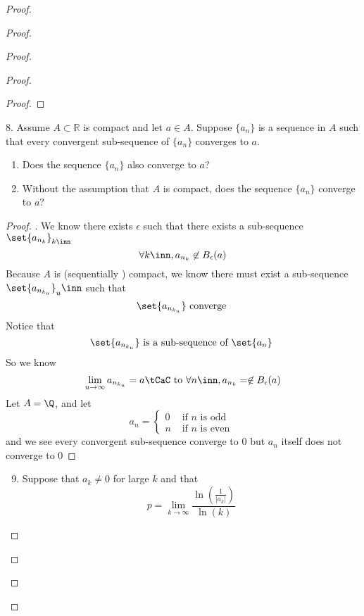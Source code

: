 \documentclass{report}
\begin{document}
\begin{proof}
\begin{proof}
\begin{proof}
\begin{proof}
\begin{proof}
\end{proof}
\begin{question}{}{}
8. Assume \( A \subset \mathbb{R} \) is compact and let \( a \in A \). Suppose \( \{ a_n \} \) is a sequence in \( A \) such that every convergent sub-sequence of \( \{ a_n \} \) converges to \( a \). 
    \begin{enumerate}
        \item Does the sequence \( \{ a_n \} \) also converge to \( a \)?
        \item Without the assumption that \( A \) is compact, does the sequence \( \{ a_n \} \) converge to \( a \)?
    \end{enumerate}
\end{question}
\begin{proof}
. We know there exists $\epsilon $ such that there exists a sub-sequence $\set{a_{n_k}}_{k\inn}$
\begin{equation*}
\forall k\inn, a_{n_k}\not\in B_{\epsilon }(a)
\end{equation*}
Because  $A$ is (sequentially ) compact,  we know there must exist a sub-sequence $\set{a_{n_{k_u}}}_u\inn$ such that
\begin{equation*}
\set{a_{n_{k_u}}}\text{ converge }
\end{equation*}
Notice that
\begin{equation*}
\set{a_{n_{k_u}}}\text{ is a sub-sequence of $\set{a_n}$ }
\end{equation*}
So we know 
 \begin{equation*}
\lim_{u\to\infty}a_{n_{k_u}}=a\tCaC\text{ to }\forall n\inn, a_{n_{k}}=\not\in B_\epsilon (a)
\end{equation*}
Let $A=\Q$, and let
 \begin{equation*}
a_n=\begin{cases}
  0& \text{ if $n$ is odd }\\
  n& \text{ if $n$ is even }
\end{cases}
\end{equation*}
and we see every convergent sub-sequence converge to $0$ but  $a_n$ itself does not converge to  $0$
\end{proof}
\begin{question}{}{}
\begin{enumerate}
    \setcounter{enumi}{8}
    \item Suppose that \( a_k \neq 0 \) for large \( k \) and that
    \[
    p = \lim_{{k \to \infty}} \frac{\ln\left(\frac{1}{|a_k|}\right)}{\ln(k)}
\]
\end{enumerate}
\end{question}
\end{proof}
\end{proof}
\end{proof}
\end{proof}
\end{document}

